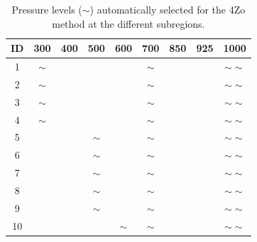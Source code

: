 \documentclass[5p]{elsarticle}
\begin{document}
\begin{table}[htb]
	\caption{Pressure levels ($\sim$) automatically selected for the 4Zo method at the different subregions.}
	\footnotesize
	\begin{center}
		\begin{tabular}{ccccccccc}
			\hline ID & 300 & 400 & 500 & 600 & 700 & 850 & 925 & 1000 \\ 
			\hline 
			1  & $\sim$ &   &   &   & $\sim$ &   &   & $\sim \sim$ \\
			2  & $\sim$ &   &   &   & $\sim$ &   &   & $\sim \sim$ \\
			3  & $\sim$ &   &   &   & $\sim$ &   &   & $\sim \sim$ \\
			4  & $\sim$ &   &   &   & $\sim$ &   &   & $\sim \sim$ \\
			5  &   &   & $\sim$ &   & $\sim$ &   &   & $\sim \sim$ \\
			6  &   &   & $\sim$ &   & $\sim$ &   &   & $\sim \sim$ \\
			7  &   &   & $\sim$ &   & $\sim$ &   &   & $\sim \sim$ \\
			8  &   &   & $\sim$ &   & $\sim$ &   &   & $\sim \sim$ \\
			9  &   &   & $\sim$ &   & $\sim$ &   &   & $\sim \sim$ \\
			10 &   &   &   & $\sim$ & $\sim$ &   &   & $\sim \sim$ \\
			\hline 
		\end{tabular} 
	\end{center}
	\label{table:levels_GA_4Zo}
\end{table}
\end{document}

